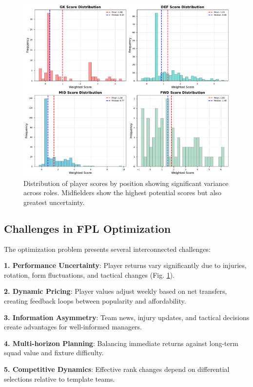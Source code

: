\documentclass[10pt,a4paper,twocolumn]{article}
\begin{document}
\begin{figure}[h]
\centering
\includegraphics[width=\columnwidth]{figures/player_score_distribution.pdf}
\caption{Distribution of player scores by position showing significant variance across roles. Midfielders show the highest potential scores but also greatest uncertainty.}
\label{fig:player_distribution}
\end{figure}

\subsection*{Challenges in FPL Optimization}

The optimization problem presents several interconnected challenges:

\textbf{1. Performance Uncertainty}: Player returns vary significantly due to injuries, rotation, form fluctuations, and tactical changes (Fig. \ref{fig:player_distribution}).

\textbf{2. Dynamic Pricing}: Player values adjust weekly based on net transfers, creating feedback loops between popularity and affordability.

\textbf{3. Information Asymmetry}: Team news, injury updates, and tactical decisions create advantages for well-informed managers.

\textbf{4. Multi-horizon Planning}: Balancing immediate returns against long-term squad value and fixture difficulty.

\textbf{5. Competitive Dynamics}: Effective rank changes depend on differential selections relative to template teams.
\end{document}
